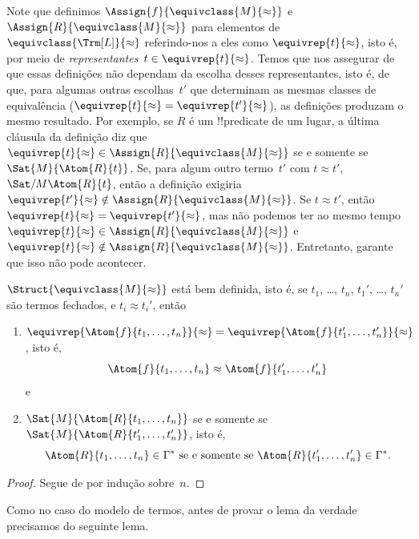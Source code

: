 \documentclass[../../../include/open-logic-section]{subfiles}
\begin{document}
\begin{explain}
Note que definimos $\Assign{f}{\equivclass{M}{\approx}}$ e
$\Assign{R}{\equivclass{M}{\approx}}$ para elementos de
$\equivclass{\Trm[L]}{\approx}$ referindo-nos a eles como
$\equivrep{t}{\approx}$, isto é, por meio de \emph{representantes}~$t \in
\equivrep{t}{\approx}$.  Temos que nos assegurar de que essas definições
não dependam da escolha desses representantes, isto é, de que, para
algumas outras escolhas~$t'$ que determinam as mesmas classes de equivalência
($\equivrep{t}{\approx} = \equivrep{t'}{\approx}$), as definições
produzam o mesmo resultado. Por exemplo, se $R$ é um !!{predicate} de um lugar,
a última cláusula da definição diz que
$\equivrep{t}{\approx} \in \Assign{R}{\equivclass{M}{\approx}}$ se e somente se
$\Sat{M}{\Atom{R}{t}}$. Se, para algum outro termo~$t'$ com $t \approx
t'$, $\Sat/{M}{\Atom{R}{t}}$, então a definição exigiria
$\equivrep{t'}{\approx} \notin \Assign{R}{\equivclass{M}{\approx}}$.
Se $t \approx t'$, então $\equivrep{t}{\approx} =
\equivrep{t'}{\approx}$, mas não podemos ter ao mesmo tempo $\equivrep{t}{\approx}
\in \Assign{R}{\equivclass{M}{\approx}}$ e $\equivrep{t}{\approx}
\notin \Assign{R}{\equivclass{M}{\approx}}$.  Entretanto,
 garante que isso não pode acontecer.
\end{explain}

\begin{prop}
$\Struct{\equivclass{M}{\approx}}$ está bem definida, isto é, se $t_1$,
  \dots, $t_n$, $t_1'$, \dots, $t_n'$ são termos fechados,
  e $t_i \approx t_i'$, então
\begin{enumerate}
\item $\equivrep{\Atom{f}{t_1,\dots, t_n}}{\approx} =
    \equivrep{\Atom{f}{t_1',\dots, t_n'}}{\approx}$, isto é,
  \[
  \Atom{f}{t_1,\dots, t_n} \approx \Atom{f}{t_1',\dots, t_n'}
  \]
  e
\item $\Sat{M}{\Atom{R}{t_1,\dots, t_n}}$ se e somente se
  $\Sat{M}{\Atom{R}{t_1',\dots, t_n'}}$, isto é,
  \[
    \Atom{R}{t_1,\dots, t_n} \in \Gamma^* \text{ se e somente se }
    \Atom{R}{t_1',\dots, t_n'} \in \Gamma^*.
  \]
\end{enumerate}
\end{prop}

\begin{proof}
Segue de  por indução sobre~$n$.
\end{proof}

Como no caso do modelo de termos, antes de provar o lema da verdade precisamos do
seguinte lema.
\end{document}
